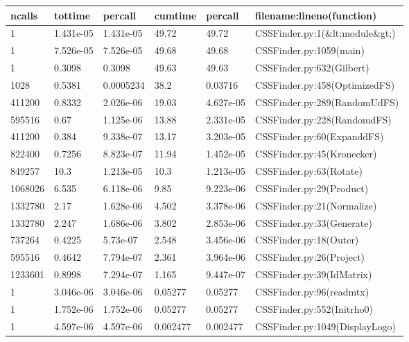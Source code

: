 \begin{tabular}{llllll}
  ncalls  & tottime   & percall   & cumtime   & percall   & filename:lineno(function)         \\
  \midrule\midrule
  1       & 1.431e-05 & 1.431e-05 & 49.72     & 49.72     & CSSFinder.py:1(\&lt;module\&gt;)  \\
  1       & 7.526e-05 & 7.526e-05 & 49.68     & 49.68     & CSSFinder.py:1059(main)           \\
  1       & 0.3098    & 0.3098    & 49.63     & 49.63     & CSSFinder.py:632(Gilbert)         \\
  1028    & 0.5381    & 0.0005234 & 38.2      & 0.03716   & CSSFinder.py:458(OptimizedFS)     \\\midrule
  411200  & 0.8332    & 2.026e-06 & 19.03     & 4.627e-05 & CSSFinder.py:289(RandomUdFS)      \\
  595516  & 0.67      & 1.125e-06 & 13.88     & 2.331e-05 & CSSFinder.py:228(RandomdFS)       \\
  411200  & 0.384     & 9.338e-07 & 13.17     & 3.203e-05 & CSSFinder.py:60(ExpanddFS)        \\
  822400  & 0.7256    & 8.823e-07 & 11.94     & 1.452e-05 & CSSFinder.py:45(Kronecker)        \\\midrule
  849257  & 10.3      & 1.213e-05 & 10.3      & 1.213e-05 & CSSFinder.py:63(Rotate)           \\
  1068026 & 6.535     & 6.118e-06 & 9.85      & 9.223e-06 & CSSFinder.py:29(Product)          \\
  1332780 & 2.17      & 1.628e-06 & 4.502     & 3.378e-06 & CSSFinder.py:21(Normalize)        \\
  1332780 & 2.247     & 1.686e-06 & 3.802     & 2.853e-06 & CSSFinder.py:33(Generate)         \\\midrule
  737264  & 0.4225    & 5.73e-07  & 2.548     & 3.456e-06 & CSSFinder.py:18(Outer)            \\
  595516  & 0.4642    & 7.794e-07 & 2.361     & 3.964e-06 & CSSFinder.py:26(Project)          \\
  1233601 & 0.8998    & 7.294e-07 & 1.165     & 9.447e-07 & CSSFinder.py:39(IdMatrix)         \\
  1       & 3.046e-06 & 3.046e-06 & 0.05277   & 0.05277   & CSSFinder.py:96(readmtx)          \\\midrule
  1       & 1.752e-06 & 1.752e-06 & 0.05277   & 0.05277   & CSSFinder.py:552(Initrho0)        \\
  1       & 4.597e-06 & 4.597e-06 & 0.002477  & 0.002477  & CSSFinder.py:1049(DisplayLogo)    \\

\end{tabular}
